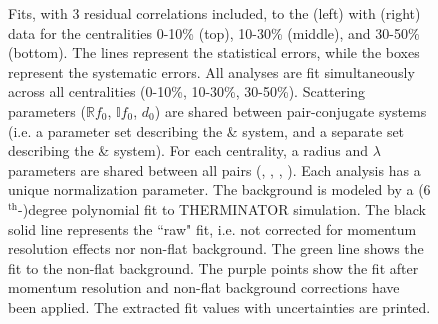 \documentclass[/home/jesse/Analysis/FemtoAnalysis/AnalysisNotes/AnalysisNoteJBuxton.tex]{subfiles}
\renewcommand{\NonFlatBgdLamKch}{_NonFlatBgdCrctnPolynomial}
\renewcommand{\ResNum}{_3Res}
\renewcommand{\PrimMaxDecay}{_PrimMaxDecay10fm}
\renewcommand{\SaveNameModLamKch}{\MomRes\NonFlatBgdLamKch\ResNum\PrimMaxDecay\ResMethod\ParamFixAndShareLamKch}
\begin{document}
\begin{landscape}
\begin{figure}[h!]
  \centering
  \caption[\LamKchMALamKchP Fits with 3 Residuals]{Fits, with 3 residual correlations included, to the \LamKchM(left) with \ALamKchP (right) data for the centralities 0-10\% (top), 10-30\% (middle), and 30-50\% (bottom).
 The lines represent the statistical errors, while the boxes represent the systematic errors.  
 All \LamKpm analyses are fit simultaneously across all centralities (0-10\%, 10-30\%, 30-50\%).
 Scattering parameters ($\mathbb{R}f_{0}$, $\mathbb{I}f_{0}$, $d_{0}$) are shared between pair-conjugate systems (i.e. a parameter set describing the \LamKchP \& \ALamKchM system, and a separate set describing the \LamKchM \& \ALamKchP system).
 For each centrality, a radius and $\lambda$ parameters are shared between all pairs (\LamKchP, \ALamKchM, \LamKchM, \ALamKchP).
 Each analysis has a unique normalization parameter.
 The background is modeled by a (6$^{\mathrm{th}}$-)degree polynomial fit to THERMINATOR simulation.
 The black solid line represents the ``raw" fit, i.e. not corrected for momentum resolution effects nor non-flat background.  
 The green line shows the fit to the non-flat background.
 The purple points show the fit after momentum resolution and non-flat background corrections have been applied.
 The extracted fit values with uncertainties are printed.}
  \label{fig:LamKchMwConjFits_3Res}
\end{figure}



\end{landscape}
\end{document}
